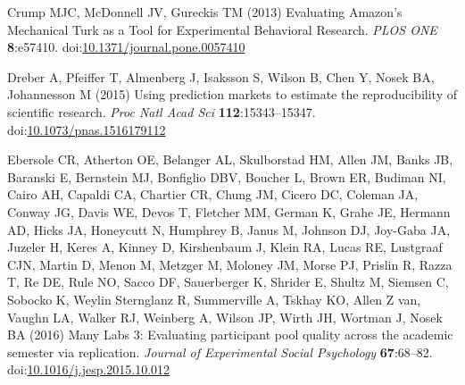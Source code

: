 \documentclass[
  english,
  a4paper,
]{article}
\newlength{\cslhangindent}
\newlength{\cslentryspacingunit} %
\newenvironment{CSLReferences}[2] %
 {%
  \setlength{\parindent}{0pt}
  \ifodd #1
  \let\oldpar\par
  \def\par{\hangindent=\cslhangindent\oldpar}
  \fi
  \setlength{\parskip}{#2\cslentryspacingunit}
 }%
 {}
\begin{document}
\begin{CSLReferences}{1}{0}
\leavevmode{}%
Crump MJC, McDonnell JV, Gureckis TM (2013) Evaluating {Amazon}'s {Mechanical Turk} as a {Tool} for {Experimental Behavioral Research}. \emph{PLOS ONE} \textbf{8}:e57410. doi:\href{https://doi.org/10.1371/journal.pone.0057410}{10.1371/journal.pone.0057410}

\leavevmode{}%
Dreber A, Pfeiffer T, Almenberg J, Isaksson S, Wilson B, Chen Y, Nosek BA, Johannesson M (2015) Using prediction markets to estimate the reproducibility of scientific research. \emph{Proc Natl Acad Sci} \textbf{112}:15343--15347. doi:\href{https://doi.org/10.1073/pnas.1516179112}{10.1073/pnas.1516179112}

\leavevmode{}%
Ebersole CR, Atherton OE, Belanger AL, Skulborstad HM, Allen JM, Banks JB, Baranski E, Bernstein MJ, Bonfiglio DBV, Boucher L, Brown ER, Budiman NI, Cairo AH, Capaldi CA, Chartier CR, Chung JM, Cicero DC, Coleman JA, Conway JG, Davis WE, Devos T, Fletcher MM, German K, Grahe JE, Hermann AD, Hicks JA, Honeycutt N, Humphrey B, Janus M, Johnson DJ, Joy-Gaba JA, Juzeler H, Keres A, Kinney D, Kirshenbaum J, Klein RA, Lucas RE, Lustgraaf CJN, Martin D, Menon M, Metzger M, Moloney JM, Morse PJ, Prislin R, Razza T, Re DE, Rule NO, Sacco DF, Sauerberger K, Shrider E, Shultz M, Siemsen C, Sobocko K, Weylin Sternglanz R, Summerville A, Tskhay KO, Allen Z van, Vaughn LA, Walker RJ, Weinberg A, Wilson JP, Wirth JH, Wortman J, Nosek BA (2016) Many {Labs} 3: {Evaluating} participant pool quality across the academic semester via replication. \emph{Journal of Experimental Social Psychology} \textbf{67}:68--82. doi:\href{https://doi.org/10.1016/j.jesp.2015.10.012}{10.1016/j.jesp.2015.10.012}


\end{CSLReferences}
\end{document}
